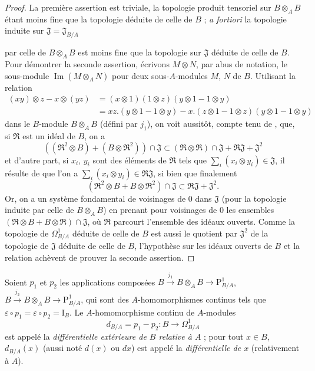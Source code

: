 \begin{proof}
La première assertion est triviale, la topologie produit tensoriel sur
$B\otimes_A B$ étant moins fine que la topologie déduite de celle de $B$ ;
\emph{a fortiori} la topologie induite sur
$\mathfrak{J}=\mathfrak{J}_{B/A}$

par celle de $B\otimes_A B$ est moins fine que la topologie sur $\mathfrak{J}$
déduite de celle de $B$. Pour démontrer la seconde assertion, écrivons
$M\otimes N$, par abus de notation, le sous-module
$\operatorname{Im}(M\otimes_A N)$ pour deux sous-$A$-modules $M$, $N$ de $B$.
Utilisant la relation
\[
\begin{aligned}
  (xy)\otimes z-x\otimes(yz)
  &=(x\otimes1)(1\otimes z)(y\otimes1-1\otimes y)\\
  &=xz.(y\otimes1-1\otimes y)
    -x.(z\otimes1-1\otimes z)(y\otimes1-1\otimes y)
\end{aligned}
\]
dans le $B$-module $B\otimes_A B$ (défini par $j_1$), on voit aussitôt,
compte tenu de , que, si $\mathfrak{R}$ est un idéal de
$B$, on a
\[
  ((\mathfrak{R}^2\otimes B)+(B\otimes\mathfrak{R}^2))\cap\mathfrak{J}
  \subset(\mathfrak{R}\otimes\mathfrak{R})\cap\mathfrak{J}
  +\mathfrak{R}\mathfrak{J}+\mathfrak{J}^2
\]
et d'autre part, si $x_i$, $y_i$ sont des éléments de $\mathfrak{R}$ tels
que $\sum_i(x_i\otimes y_i)\in\mathfrak{J}$, il résulte de
 que l'on a
$\sum_i(x_i\otimes y_i)\in\mathfrak{R}\mathfrak{J}$, si bien que finalement
\begin{equation}
\tag{20.4.5.1}
\label{0.20.4.5.1-fr}
  (\mathfrak{R}^2\otimes B+B\otimes\mathfrak{R}^2)\cap\mathfrak{J}
  \subset\mathfrak{R}\mathfrak{J}+\mathfrak{J}^2.
\end{equation}
Or, on a un système fondamental de voisinages de $0$ dans $\mathfrak{J}$
(pour la topologie induite par celle de $B\otimes_A B$) en prenant pour
voisinages de $0$ les ensembles
$(\mathfrak{R}\otimes B+B\otimes\mathfrak{R})\cap\mathfrak{J}$, où
$\mathfrak{R}$ parcourt l'ensemble des idéaux ouverts. Comme la topologie de
$\Omega^1_{B/A}$ déduite de celle de $B$ est aussi le quotient par
$\mathfrak{J}^2$ de la topologie de $\mathfrak{J}$ déduite de celle de $B$,
l'hypothèse sur les idéaux ouverts de $B$ et la relation
 achèvent de prouver la seconde assertion.
\end{proof}

\begin{definition}[20.4.6]
\label{0.20.4.6-fr}
Soient $p_1$ et $p_2$ les applications composées
$B\xrightarrow{j_1}B\otimes_A B\to\mathrm{P}^1_{B/A}$,
$B\xrightarrow{j_2}B\otimes_A B\to\mathrm{P}^1_{B/A}$, qui sont des
$A$-homomorphismes continus tels que
$\varepsilon\circ p_1=\varepsilon\circ p_2=\mathrm{I}_B$. Le
$A$-homomorphisme continu de $A$-modules
\begin{equation}
\tag{20.4.6.1}
\label{0.20.4.6.1-fr}
  d_{B/A}=p_1-p_2:B\to\Omega^1_{B/A}
\end{equation}
est appelé la \emph{différentielle extérieure de $B$ relative à $A$} ; pour
tout $x\in B$, $d_{B/A}(x)$ (aussi noté $d(x)$ ou $dx$) est appelé la
\emph{différentielle de $x$} (relativement à $A$).
\end{definition}


